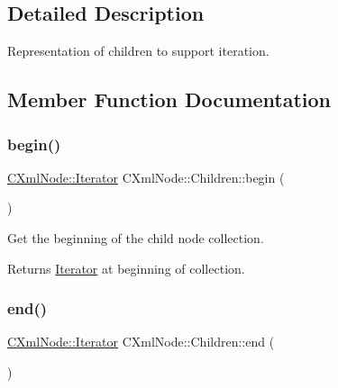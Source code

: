 \subsection{Detailed Description}
Representation of children to support iteration. 

\subsection{Member Function Documentation}
\mbox{\label{classxmlnode_1_1_c_xml_node_1_1_children_a8f0cac16fdda64bbf10cb08eba606dd1}} 
\subsubsection{\texorpdfstring{begin()}{begin()}}
{\footnotesize\ttfamily \mbox{\hyperlink{classxmlnode_1_1_c_xml_node_1_1_iterator}{C\+Xml\+Node\+::\+Iterator}} C\+Xml\+Node\+::\+Children\+::begin (\begin{DoxyParamCaption}{ }\end{DoxyParamCaption})}



Get the beginning of the child node collection. 

\begin{DoxyReturn}{Returns}
\mbox{\hyperlink{classxmlnode_1_1_c_xml_node_1_1_iterator}{Iterator}} at beginning of collection. 
\end{DoxyReturn}
\mbox{\label{classxmlnode_1_1_c_xml_node_1_1_children_a3fe6fb9e62c63d6a9ea46653608d42e8}} 
\subsubsection{\texorpdfstring{end()}{end()}}
{\footnotesize\ttfamily \mbox{\hyperlink{classxmlnode_1_1_c_xml_node_1_1_iterator}{C\+Xml\+Node\+::\+Iterator}} C\+Xml\+Node\+::\+Children\+::end (\begin{DoxyParamCaption}{ }\end{DoxyParamCaption})}



